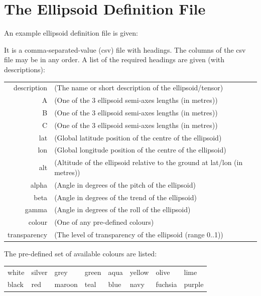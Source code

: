 \documentclass[11pt]{article}
\begin{document}
\section{The Ellipsoid Definition File}
An example ellipsoid definition file is given:

It is a comma-separated-value (csv) file with headings. The columns of the csv file may be in any order. A list of the required headings are given (with descriptions):
\begin{table}[h]
\begin{tabular}{rl}
 description & (The name or short description of the ellipsoid/tensor)  \\
 A           & (One of the 3 ellipsoid semi-axes lengths (in metres))  \\
 B           & (One of the 3 ellipsoid semi-axes lengths (in metres))  \\
 C           & (One of the 3 ellipsoid semi-axes lengths (in metres))  \\
 lat         & (Global latitude position of the centre of the ellipsoid)  \\
 lon         & (Global longitude position of the centre of the ellipsoid) \\
 alt         & (Altitude of the ellipsoid relative to the ground at lat/lon (in metres))  \\
 alpha       & (Angle in degrees of the pitch of the ellipsoid)  \\
 beta        & (Angle in degrees of the trend of the ellipsoid)  \\
 gamma       & (Angle in degrees of the roll of the ellipsoid)  \\
 colour      & (One of any pre-defined colours)  \\
 transparency& (The level of transparency of the ellipsoid (range 0..1))
\end{tabular}
\end{table}

\noindent The pre-defined set of available colours are listed:
\begin{table}[h]
\begin{tabular}{llllllll}
 white  & silver & grey   & green  & aqua & yellow & olive   & lime   \\
 black  & red    & maroon & teal   & blue & navy   & fuchsia & purple 
\end{tabular}
\end{table}
\end{document}

